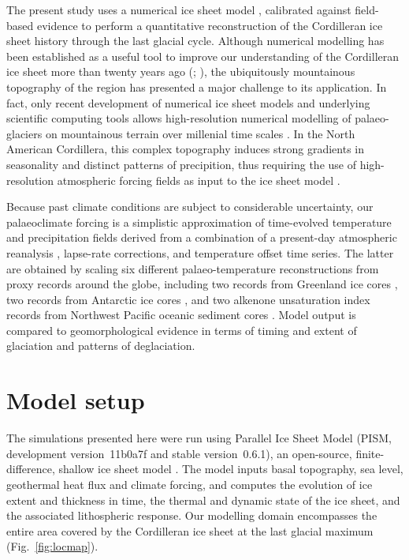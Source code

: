 \documentclass[tc, manuscript]{copernicus}
\begin{document}
The present study uses a numerical ice sheet model \citep{PISM-authors.2014},
calibrated against field-based evidence to perform a quantitative
reconstruction of the Cordilleran ice sheet history through the last glacial
cycle. Although numerical modelling has been established as a useful tool to
improve our understanding of the Cordilleran ice sheet more than twenty years
ago (\citealp[p.~227]{Jackson.Clague.1991}; \citealp{Robert.1991}), the
ubiquitously mountainous
topography of the region has presented a major challenge to its application.
In fact, only recent development of numerical ice sheet models and underlying
scientific computing tools \citep{Bueler.Brown.2009, Balay.etal.2014} allows
high-resolution numerical modelling of palaeo-glaciers on mountainous terrain
over millenial time scales \citep{Golledge.etal.2012}. In the North
American Cordillera, this complex topography induces strong gradients in
seasonality and distinct patterns of precipition, thus requiring the use of
high-resolution atmospheric forcing fields as input to the ice sheet model
\citep{Seguinot.etal.2013}.

Because past climate conditions are subject to considerable uncertainty, our
palaeoclimate forcing is a simplistic approximation of time-evolved temperature
and precipitation fields derived from a combination of a present-day
atmospheric reanalysis \citep{Mesinger.etal.2006}, lapse-rate corrections,
and temperature offset time series. The latter are obtained by scaling six
different palaeo-temperature reconstructions from proxy records around the
globe, including two  records from Greenland ice cores
\citep{Dansgaard.etal.1993, Andersen.etal.2004}, two 
records from Antarctic ice cores \citep{Petit.etal.1999,Jouzel.etal.2007},
and two alkenone unsaturation index records from Northwest Pacific oceanic
sediment cores \citep{Herbert.etal.2001}. Model output is compared to
geomorphological evidence in terms of timing and extent of glaciation and
patterns of deglaciation.


\section{Model setup}
\label{sec:model}

The simulations presented here were run using Parallel Ice Sheet Model (PISM,
development version~11b0a7f and stable version~0.6.1), an open-source,
finite-difference, shallow ice sheet model \citep{PISM-authors.2014}.
The model inputs basal topography, sea level, geothermal
heat flux and climate forcing, and computes the evolution of ice extent
and thickness in time, the thermal and dynamic state of the ice sheet, and
the associated lithospheric response. Our modelling domain encompasses the
entire area covered by the Cordilleran ice sheet at the last glacial maximum
(Fig.~\ref{fig:locmap}).
\end{document}

